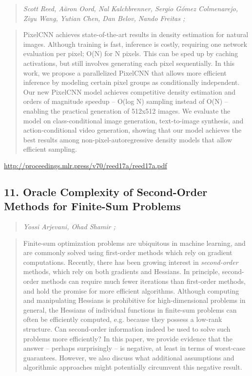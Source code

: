 \documentclass{article}
\begin{document}
\begin{quote}
\footnotesize{\textit{Scott Reed, Aäron Oord, Nal Kalchbrenner, Sergio Gómez Colmenarejo, Ziyu Wang, Yutian Chen, Dan Belov, Nando Freitas ;}}

\end{quote}

\begin{quote}
    PixelCNN achieves state-of-the-art results in density estimation for natural images. Although training is fast, inference is costly, requiring one network evaluation per pixel; O(N) for N pixels. This can be sped up by caching activations, but still involves generating each pixel sequentially. In this work, we propose a parallelized PixelCNN that allows more efficient inference by modeling certain pixel groups as conditionally independent. Our new PixelCNN model achieves competitive density estimation and orders of magnitude speedup – O(log N) sampling instead of O(N) – enabling the practical generation of 512x512 images. We evaluate the model on class-conditional image generation, text-to-image synthesis, and action-conditional video generation, showing that our model achieves the best results among non-pixel-autoregressive density models that allow efficient sampling.  
\end{quote}

\href{http://proceedings.mlr.press/v70/reed17a/reed17a.pdf}{http://proceedings.mlr.press/v70/reed17a/reed17a.pdf}

\subsection{11. Oracle Complexity of Second-Order Methods for Finite-Sum Problems}

\begin{quote}
\footnotesize{\textit{Yossi Arjevani, Ohad Shamir ;}}

\end{quote}

\begin{quote}
    Finite-sum optimization problems are ubiquitous in machine learning, and are commonly solved using first-order methods which rely on gradient computations. Recently, there has been growing interest in \textit{second-order} methods, which rely on both gradients and Hessians. In principle, second-order methods can require much fewer iterations than first-order methods, and hold the promise for more efficient algorithms. Although computing and manipulating Hessians is prohibitive for high-dimensional problems in general, the Hessians of individual functions in finite-sum problems can often be efficiently computed, e.g. because they possess a low-rank structure. Can second-order information indeed be used to solve such problems more efficiently? In this paper, we provide evidence that the answer – perhaps surprisingly – is negative, at least in terms of worst-case guarantees. However, we also discuss what additional assumptions and algorithmic approaches might potentially circumvent this negative result.  
\end{quote}
\end{document}
